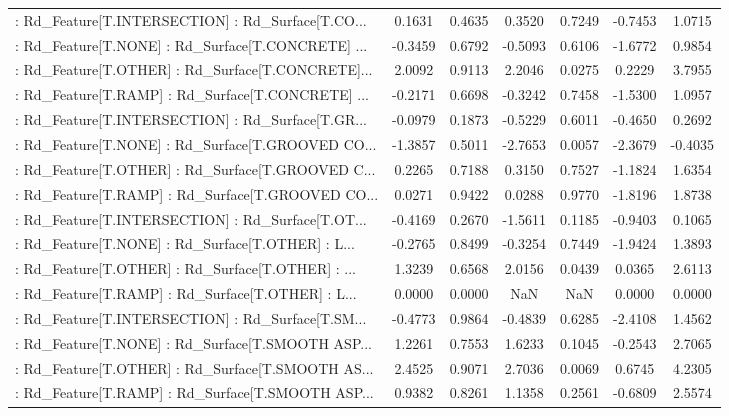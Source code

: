 \begin{longtable}{p{4cm}cccccc}
 : Rd\_Feature[T.INTERSECTION] : Rd\_Surface[T.CO... &  0.1631 &    0.4635 &  0.3520 &       0.7249 & -0.7453 &  1.0715 \\
 : Rd\_Feature[T.NONE] : Rd\_Surface[T.CONCRETE] ... & -0.3459 &    0.6792 & -0.5093 &       0.6106 & -1.6772 &  0.9854 \\
 : Rd\_Feature[T.OTHER] : Rd\_Surface[T.CONCRETE]... &  2.0092 &    0.9113 &  2.2046 &       0.0275 &  0.2229 &  3.7955 \\
 : Rd\_Feature[T.RAMP] : Rd\_Surface[T.CONCRETE] ... & -0.2171 &    0.6698 & -0.3242 &       0.7458 & -1.5300 &  1.0957 \\
 : Rd\_Feature[T.INTERSECTION] : Rd\_Surface[T.GR... & -0.0979 &    0.1873 & -0.5229 &       0.6011 & -0.4650 &  0.2692 \\
 : Rd\_Feature[T.NONE] : Rd\_Surface[T.GROOVED CO... & -1.3857 &    0.5011 & -2.7653 &       0.0057 & -2.3679 & -0.4035 \\
 : Rd\_Feature[T.OTHER] : Rd\_Surface[T.GROOVED C... &  0.2265 &    0.7188 &  0.3150 &       0.7527 & -1.1824 &  1.6354 \\
 : Rd\_Feature[T.RAMP] : Rd\_Surface[T.GROOVED CO... &  0.0271 &    0.9422 &  0.0288 &       0.9770 & -1.8196 &  1.8738 \\
 : Rd\_Feature[T.INTERSECTION] : Rd\_Surface[T.OT... & -0.4169 &    0.2670 & -1.5611 &       0.1185 & -0.9403 &  0.1065 \\
 : Rd\_Feature[T.NONE] : Rd\_Surface[T.OTHER] : L... & -0.2765 &    0.8499 & -0.3254 &       0.7449 & -1.9424 &  1.3893 \\
 : Rd\_Feature[T.OTHER] : Rd\_Surface[T.OTHER] : ... &  1.3239 &    0.6568 &  2.0156 &       0.0439 &  0.0365 &  2.6113 \\
 : Rd\_Feature[T.RAMP] : Rd\_Surface[T.OTHER] : L... &  0.0000 &    0.0000 &     NaN &          NaN &  0.0000 &  0.0000 \\
 : Rd\_Feature[T.INTERSECTION] : Rd\_Surface[T.SM... & -0.4773 &    0.9864 & -0.4839 &       0.6285 & -2.4108 &  1.4562 \\
 : Rd\_Feature[T.NONE] : Rd\_Surface[T.SMOOTH ASP... &  1.2261 &    0.7553 &  1.6233 &       0.1045 & -0.2543 &  2.7065 \\
 : Rd\_Feature[T.OTHER] : Rd\_Surface[T.SMOOTH AS... &  2.4525 &    0.9071 &  2.7036 &       0.0069 &  0.6745 &  4.2305 \\
 : Rd\_Feature[T.RAMP] : Rd\_Surface[T.SMOOTH ASP... &  0.9382 &    0.8261 &  1.1358 &       0.2561 & -0.6809 &  2.5574 \\

\end{longtable}

